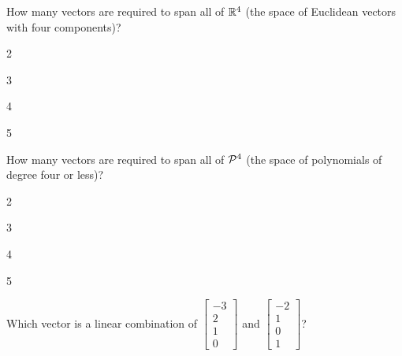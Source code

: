 \documentclass{article}
\begin{document}
\begin{readinessAssuranceTest}
\item How many vectors are required to span all of \(\IR^4\) (the space
  of Euclidean vectors with four components)?

  \begin{multicols}{4}
  \begin{readinessAssuranceTestChoices}
  \item 2
  \item 3
  \item 4 %
  \item 5
  \end{readinessAssuranceTestChoices}
  \end{multicols}

\item How many vectors are required to span all of \(\P^4\) (the space
  of polynomials of degree four or less)?

  \begin{multicols}{4}
  \begin{readinessAssuranceTestChoices}
  \item 2
  \item 3 %
  \item 4
  \item 5
  \end{readinessAssuranceTestChoices}
  \end{multicols}

\item Which vector is a linear combination of \(
\begin{bmatrix}
  -3 \\ 2 \\ 1 \\ 0
\end{bmatrix}\) and \(
\begin{bmatrix}
  -2 \\ 1 \\ 0 \\ 1
\end{bmatrix}\)?


\end{readinessAssuranceTest}
\end{document}
